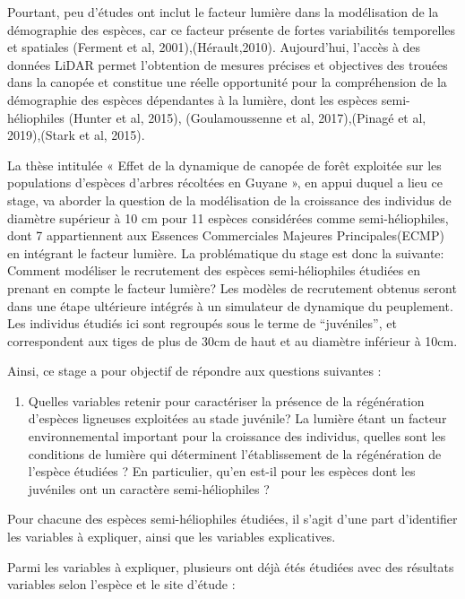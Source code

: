 \documentclass[
  12pt,
  american,
  a4paper,
  extrafontsizes,onecolumn,openright
  ]{memoir}
\providecommand{\tightlist}{%
  \setlength{\itemsep}{0pt}\setlength{\parskip}{0pt}}
\begin{document}
Pourtant, peu d'études ont inclut le facteur lumière dans la modélisation de la démographie des espèces, car ce facteur présente de fortes variabilités temporelles et spatiales (Ferment et al, 2001),(Hérault,2010). Aujourd'hui, l'accès à des données LiDAR permet l'obtention de mesures précises et objectives des trouées dans la canopée et constitue une réelle opportunité pour la compréhension de la démographie des espèces dépendantes à la lumière, dont les espèces semi-héliophiles (Hunter et al, 2015), (Goulamoussenne et al, 2017),(Pinagé et al, 2019),(Stark et al, 2015).

La thèse intitulée « Effet de la dynamique de canopée de forêt exploitée sur les populations d'espèces d'arbres récoltées en Guyane », en appui duquel a lieu ce stage, va aborder la question de la modélisation de la croissance des individus de diamètre supérieur à 10 cm pour 11 espèces considérées comme semi-héliophiles, dont 7 appartiennent aux Essences Commerciales Majeures Principales(ECMP) en intégrant le facteur lumière.
La problématique du stage est donc la suivante: Comment modéliser le recrutement des espèces semi-héliophiles étudiées en prenant en compte le facteur lumière?
Les modèles de recrutement obtenus seront dans une étape ultérieure intégrés à un simulateur de dynamique du peuplement. Les individus étudiés ici sont regroupés sous le terme de ``juvéniles'', et correspondent aux tiges de plus de 30cm de haut et au diamètre inférieur à 10cm.

Ainsi, ce stage a pour objectif de répondre aux questions suivantes :

\begin{enumerate}
\def\labelenumi{\arabic{enumi})}
\tightlist
\item
  Quelles variables retenir pour caractériser la présence de la régénération d'espèces ligneuses exploitées au stade juvénile?
  La lumière étant un facteur environnemental important pour la croissance des individus, quelles sont les conditions de lumière qui déterminent l'établissement de la régénération de l'espèce étudiées ?
  En particulier, qu'en est-il pour les espèces dont les juvéniles ont un caractère semi-héliophiles ?
\end{enumerate}

Pour chacune des espèces semi-héliophiles étudiées, il s'agit d'une part d'identifier les variables à expliquer, ainsi que les variables explicatives.

Parmi les variables à expliquer, plusieurs ont déjà étés étudiées avec des résultats variables selon l'espèce et le site d'étude :
\end{document}
